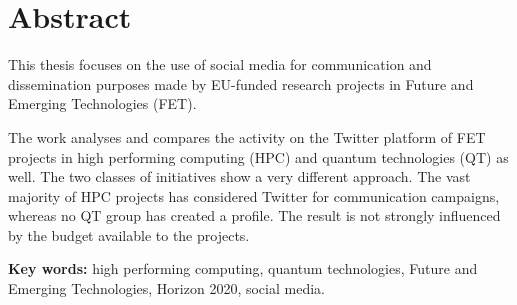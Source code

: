 \chapter*{Abstract}
This thesis focuses on the use of social media for communication and dissemination purposes made by EU-funded research projects in Future and Emerging Technologies (FET). 

The work analyses and compares the activity on the Twitter platform of FET projects in high performing computing (HPC) and quantum technologies (QT) as well. The two classes of initiatives show a very different approach. The vast majority of HPC projects has considered Twitter for communication campaigns, whereas no QT group has created a profile. The result is not strongly influenced by the budget available to the projects.  


   
   

\textbf{Key words:} high performing computing, quantum technologies, Future and Emerging Technologies, Horizon 2020, social media.